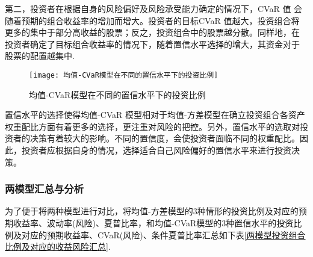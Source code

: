 \documentclass[withoutpreface,bwprint]{cumcmthesis} %
\begin{document}
第二，投资者在根据自身的风险偏好及风险承受能力确定的情况下，CVaR 值
会随着预期的组合收益率的增加而增大。投资者的目标CVaR 值越大，投资组合将
更多的集中于部分高收益的股票；反之，投资组合中的股票越分散。同样地，在
投资者确定了目标组合收益率的情况下，随着置信水平选择的增大，其资金对于
股票的配置越集中.
		\begin{figure}[H]
	\centering
	\texttt{[image: 均值-CVaR模型在不同的置信水平下的投资比例]}
	\caption{均值-CVaR模型在不同的置信水平下的投资比例}
	\label{均值-CVaR模型在不同的置信水平下的投资比例}
\end{figure}
置信水平的选择使得均值-CVaR 模型相对于均值-方差模型在确立投资组合各资产权重配比方面有着更多的选择，更注重对风险的把控。另外，置信水平的选取对投资者的决策有着较大的影响。不同的置信度，会使投资者面临不同的权重配比。因此，投资者应根据自身的情况，选择适合自己风险偏好的置信水平来进行投资决策。
	\subsubsection{两模型汇总与分析}
	为了便于将两种模型进行对比，将均值-方差模型的3种情形的投资比例及对应的预期收益率、波动率(风险)、夏普比率，和均值-CVaR模型的3种置信水平的投资比例及对应的预期收益率、CVaR(风险)、条件夏普比率汇总如下表\ref{两模型投资组合比例及对应的收益风险汇总}.
\end{document}
